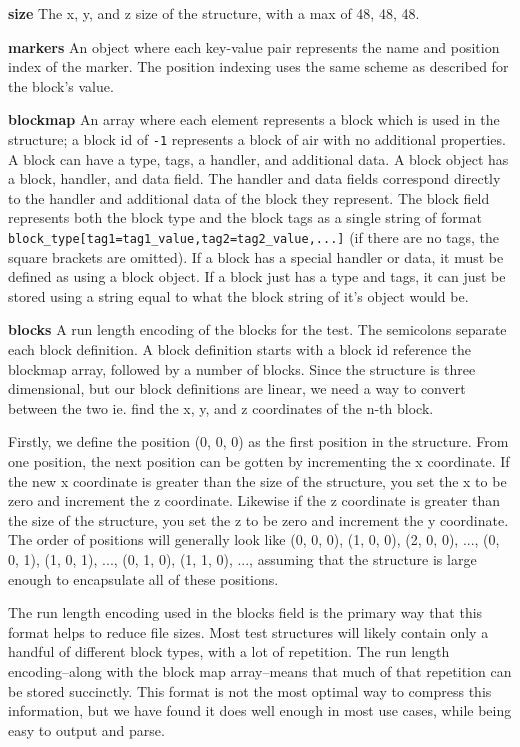 \documentclass[12pt]{article}
\def\code#1{\texttt{#1}}
\begin{document}
\begin{onehalfspacing}
\noindent\textbf{size}
The x, y, and z size of the structure, with a max of 48, 48, 48.

\noindent\textbf{markers}
An object where each key-value pair represents the name and position
index of the marker. The position indexing uses the same scheme as
described for the block's value.

\noindent\textbf{blockmap}
An array where each element represents a block which is used in the
structure; a block id of \code{-1} represents a block of air with no additional properties.
A block can have a type, tags, a handler, and additional
data. A block object has a block, handler, and data field. The handler
and data fields correspond directly to the handler and additional data
of the block they represent. The block field represents both the block
type and the block tags as a single string of format
\code{block\_type{[}tag1=tag1\_value,tag2=tag2\_value,...{]}} (if there are
no tags, the square brackets are omitted). If a block has a special
handler or data, it must be defined as using a block object. If a block
just has a type and tags, it can just be stored using a string equal to
what the block string of it's object would be.

\noindent\textbf{blocks}
A run length encoding of the blocks for the test. The semicolons
separate each block definition. A block definition starts with a block
id reference the blockmap array, followed by a number of blocks. Since
the structure is three dimensional, but our block definitions are
linear, we need a way to convert between the two ie. find the x, y, and
z coordinates of the n-th block.

Firstly, we define the position (0, 0, 0) as the first position in the
structure. From one position, the next position can be gotten by
incrementing the x coordinate. If the new x coordinate is greater than
the size of the structure, you set the x to be zero and increment the z
coordinate. Likewise if the z coordinate is greater than the size of the
structure, you set the z to be zero and increment the y coordinate. The
order of positions will generally look like (0, 0, 0), (1, 0, 0), (2, 0,
0), ..., (0, 0, 1), (1, 0, 1), ..., (0, 1, 0), (1, 1, 0), ..., assuming
that the structure is large enough to encapsulate all of these
positions.

The run length encoding used in the blocks field is the primary way that
this format helps to reduce file sizes. Most test structures will likely
contain only a handful of different block types, with a lot of
repetition. The run length encoding--along with the block map
array--means that much of that repetition can be stored succinctly. This
format is not the most optimal way to compress this information, but we
have found it does well enough in most use cases, while being easy to
output and parse.


\end{onehalfspacing}
\end{document}
